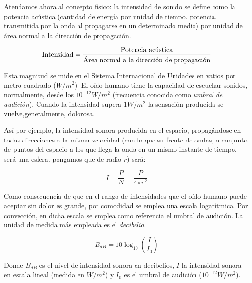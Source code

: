 \documentclass[11pt,a4paper]{article}
\begin{document}
	Atendamos ahora al concepto físico: la intensidad de sonido se define como la potencia acústica (cantidad de energía por unidad de tiempo, potencia, transmitida por la onda al propagarse en un determinado medio) por unidad de área normal a la dirección de propagación.
	
	$$
		\hbox{Intensidad} = \frac{\hbox{Potencia acústica}}{\hbox{Área normal a la dirección de propagación}}
	$$
	
	Esta magnitud se mide en el Sistema Internacional de Unidades en vatios por metro cuadrado ($ W / m^2$). El oído humano tiene la capacidad de escuchar sonidos, normalmente, desde los $10^{-12} W/m^2$ (frecuencia conocida como \emph{umbral de audición}). Cuando la intensidad supera $1 W/m^2$ la sensación producida se vuelve,generalmente, dolorosa.
	
	Así por ejemplo, la intensidad sonora producida en el espacio, propagándose en todas direcciones a la misma velocidad (con lo que su frente de ondas, o conjunto de puntos del espacio a los que llega la onda en un mismo instante de tiempo, será una esfera, pongamos que de radio $r$) será: 
	
	$$
	I = \frac{P}{N} = \frac{P}{4\pi r^2}
	$$
	
	Como consecuencia de que en el rango de intensidades que el oído humano puede aceptar sin dolor es grande, por comodidad se emplea una escala logarítmica. Por convección, en dicha escala se emplea como referencia el umbral de audición. La unidad de medida más empleada es el \emph{decibelio}.
	
	$$
		B_{dB} = 10 \log_{10} \left( \frac{I}{I_{0}} \right)
	$$
	
	Donde $B_{dB}$ es el nivel de intensidad sonora en decibelios, $I$ la intensidad sonora en escala lineal (medida en $W/m^2$) y $I_{0}$ es el umbral de audición ($10^{-12} W/m^2$).
\end{document}
